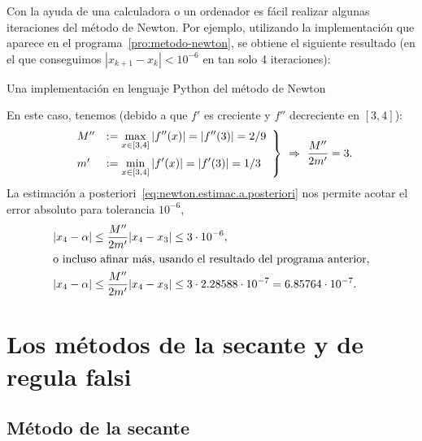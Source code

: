 \begin{example}
  Con la ayuda de una calculadora o un ordenador es fácil realizar
  algunas iteraciones del método de Newton. Por ejemplo, utilizando la
  implementación que aparece en el programa~\ref{pro:metodo-newton},
  se obtiene el siguiente resultado (en el que conseguimos
  $|x_{k+1}-x_k|<10^{-6}$ en tan solo 4 iteraciones):
  \begin{pythonoutput}
  \end{pythonoutput}    
  \begin{program}
    \label{pro:metodo-newton}
    \caption{Una implementación en lenguaje Python del método de
      Newton}
  \end{program}

  En este caso, tenemos (debido a que $f'$ es creciente y $f''$
  decreciente en $[3,4]$):
  \begin{equation*}
    \left.
    \begin{array}{ll}
      M''&:=\displaystyle\max_{x\in[3,4]}|f''(x)|=|f''(3)|=2/9
      \\\noalign{\medskip}
      m'&:=\displaystyle\min_{x\in[3,4]} |f'(x)|=|f'(3)|=1/3
    \end{array}
    \right\} \ \Rightarrow \
    \frac{M''}{2m'} = 3.
  \end{equation*}
  La estimación a
  posteriori~\eqref{eq:newton.estimac.a.posteriori} nos permite acotar el
  error absoluto para tolerancia $10^{-6}$,
  \begin{align*}
    |x_{4}-\alpha|&\le \frac{M''}{2m'} |x_4-x_3| \le 3\cdot 10^{-6},
    \\
    \intertext{o incluso afinar más, usando el resultado del programa anterior,}
    |x_{4}-\alpha|&\le \frac{M''}{2m'} |x_4-x_3| \le 3 \cdot 2.28588
    \cdot 10^{-7}
    = 6.85764 \cdot 10^{-7}.
  \end{align*}
\end{example}

\section{Los métodos de la secante y de regula falsi}
\label{sec:secante-y-regula-falsi}

\subsection{Método de la secante}
\label{sec:metodo-secante}

